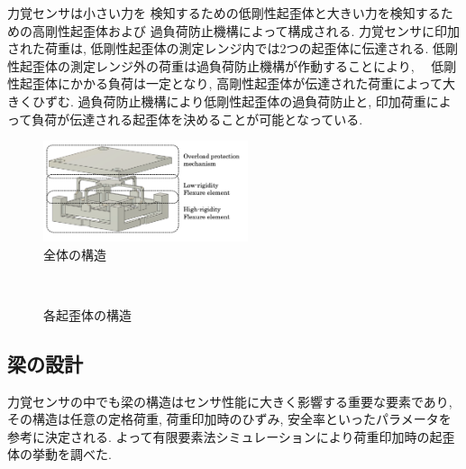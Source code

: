 力覚センサは小さい力を
検知するための低剛性起歪体と大きい力を検知するための高剛性起歪体および
過負荷防止機構によって構成される. 
力覚センサに印加された荷重は, 低剛性起歪体の測定レンジ内では2つの起歪体に伝達される. 
低剛性起歪体の測定レンジ外の荷重は過負荷防止機構が作動することにより,　
低剛性起歪体にかかる負荷は一定となり, 高剛性起歪体が伝達された荷重によって大きくひずむ. 
過負荷防止機構により低剛性起歪体の過負荷防止と, 
印加荷重によって負荷が伝達される起歪体を決めることが可能となっている. 
\begin{figure}[b]
  \begin{center}
    \includegraphics[width=6.0cm]{pic/sensor.png}
    \caption{全体の構造}\label{fig:sensor}
  \end{center}
 \end{figure}
 \begin{figure}[b]
  \centering
  \\
  \caption[]{各起歪体の構造}\label{fig:kiwaitai}
\end{figure}

\subsection{梁の設計}
力覚センサの中でも梁の構造はセンサ性能に大きく影響する重要な要素であり, 
その構造は任意の定格荷重, 荷重印加時のひずみ, 安全率といったパラメータを参考に決定される.
よって有限要素法シミュレーションにより荷重印加時の起歪体の挙動を調べた.

